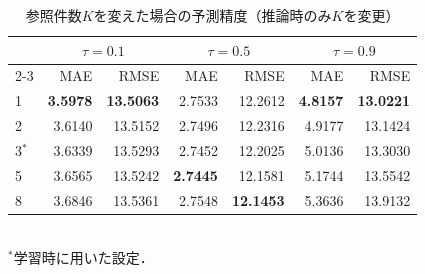 \begin{table}[t]
    \revAcolor
    \caption{参照件数$K$を変えた場合の予測精度（推論時のみ$K$を変更）}
    \label{tab:topk_sensitivity}
    \centering
    \setlength{\tabcolsep}{4pt}%
    \begin{tabular}{lrrrrrr}
        \hline
        & \multicolumn{2}{c}{$\tau=0.1$} & \multicolumn{2}{c}{$\tau=0.5$} & \multicolumn{2}{c}{$\tau=0.9$} \\
        \cline{2-3} \cline{4-5} \cline{6-7}
        \multicolumn{1}{c}{$K$} & MAE & RMSE & MAE & RMSE & MAE & RMSE \\
        \hline\hline
        1 & \textbf{3.5978} & \textbf{13.5063} & 2.7533 & 12.2612 & \textbf{4.8157} & \textbf{13.0221} \\
        2 & 3.6140 & 13.5152 & 2.7496 & 12.2316 & 4.9177 & 13.1424 \\
        3$^{*}$ & 3.6339 & 13.5293 & 2.7452 & 12.2025 & 5.0136 & 13.3030 \\
        5 & 3.6565 & 13.5242 & \textbf{2.7445} & 12.1581 & 5.1744 & 13.5542 \\
        8 & 3.6846 & 13.5361 & 2.7548 & \textbf{12.1453} & 5.3636 & 13.9132 \\
        \hline
    \end{tabular}
    \\[2pt] \footnotesize $^{*}$学習時に用いた設定．
\end{table}
